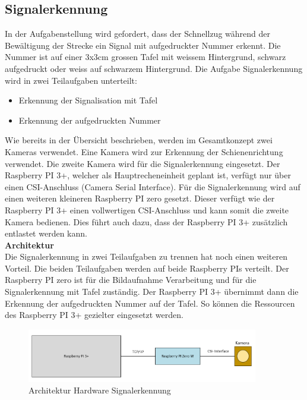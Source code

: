 \documentclass[../../main.tex]{subfiles}
\begin{document}
\subsection{Signalerkennung}
    In der Aufgabenstellung wird gefordert, dass der Schnellzug während der Bewältigung der Strecke ein Signal mit aufgedruckter Nummer erkennt. Die Nummer ist auf einer 3x3cm grossen Tafel mit weissem Hintergrund, schwarz aufgedruckt oder weiss auf schwarzem Hintergrund. Die Aufgabe Signalerkennung wird in zwei Teilaufgaben unterteilt:
    \begin{itemize}
        \item Erkennung der Signalisation mit Tafel
        \item Erkennung der aufgedruckten Nummer
    \end{itemize}
    Wie bereits in der Übersicht beschrieben, werden im Gesamtkonzept zwei Kameras verwendet. Eine Kamera wird zur Erkennung der Schienenrichtung verwendet. Die zweite Kamera wird für die Signalerkennung eingesetzt. Der Raspberry PI 3+, welcher als Hauptrecheneinheit geplant ist, verfügt nur über einen CSI-Anschluss (Camera Serial Interface). Für die Signalerkennung wird auf einen weiteren kleineren Raspberry PI zero gesetzt. Dieser verfügt wie der Raspberry PI 3+ einen vollwertigen CSI-Anschluss und kann somit die zweite Kamera bedienen. Dies führt auch dazu, dass der Raspberry PI 3+ zusätzlich entlastet werden kann.\\

    \textbf{Architektur}\\
    Die Signalerkennung in zwei Teilaufgaben zu trennen hat noch einen weiteren Vorteil. Die beiden Teilaufgaben werden auf beide Raspberry PIs verteilt. Der Raspberry PI zero ist für die Bildaufnahme Verarbeitung und für die Signalerkennung mit Tafel zuständig. Der Raspberry PI 3+ übernimmt dann die Erkennung der aufgedruckten Nummer auf der Tafel. So können die Ressourcen des Raspberry PI 3+ gezielter eingesetzt werden.

    \begin{figure}[H] %
        \centering
        \includegraphics[width=0.9\textwidth]{Architektur.png}
        \caption{Architektur Hardware Signalerkennung}
        \label{fig:architektur_hardware_signalerkennung}
    \end{figure}
\end{document}
